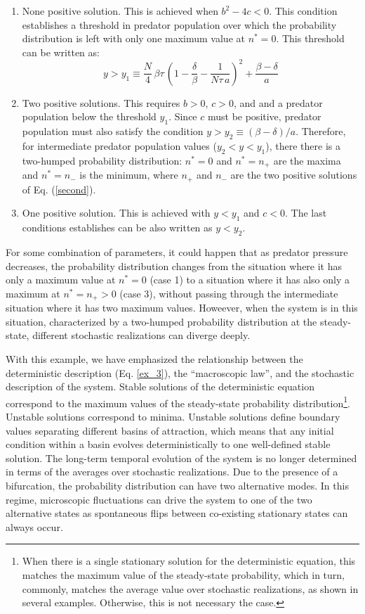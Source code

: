\documentclass{article}
\begin{document}
\begin{enumerate}
\item None positive solution. This is achieved when $b^2 - 4c<0$. This condition establishes a threshold in predator population over which the probability distribution is left with only one maximum value at $n^{*}=0$. This threshold can be written as: 
\begin{equation}
y > y_{1} \equiv \frac{N}{4}\,\beta\tau\,\left(1-\frac{\delta}{\beta}-\frac{1}{N\tau\,a}\right)^2 + \frac{\beta-\delta}{a}
\end{equation}   
\item Two positive solutions. This requires $b>0$, $c>0$, and and a predator population below the threshold $y_{1}$. Since $c$ must be positive, predator population must also satisfy the condition $y > y_{2} \equiv (\beta-\delta)/a$. Therefore, for intermediate predator population values ($y_{2}<y<y_{1}$), there there is a two-humped probability distribution: $n^{*}=0$ and $n^{*}=n_{+}$ are the maxima and $n^{*}=n_{-}$ is the minimum, where $n_{+}$ and $n_{-}$ are the two positive solutions of Eq. (\ref{second}).  
\item One positive solution. This is achieved with $y<y_{1}$ and $c<0$. The last conditions establishes can be also written as $y<y_{2}$. 
\end{enumerate}
For some combination of parameters, it could happen that as predator pressure decreases, the probability distribution changes from the situation where it has only a maximum value at $n^{*}=0$ (case 1) to a situation where it has also only a maximum at $n^{*}=n_{+}>0$ (case 3), without passing through the intermediate situation where it has two maximum values. Howeever, when the system is in this situation, characterized by a two-humped probability distribution at the steady-state, different stochastic realizations can diverge deeply.
\smallskip 
 
With this example, we have emphasized the relationship between the deterministic description (Eq. \ref{ex_3}), the ``macroscopic law'', and the stochastic description of the system. Stable solutions of the deterministic equation correspond to the maximum values of the steady-state probability distribution\footnote{When there is a single stationary solution for the deterministic equation, this matches the maximum value of the steady-state probability, which in turn, commonly, matches the average value over stochastic realizations, as shown in several examples. Otherwise, this is not necessary the case.}. Unstable solutions correspond to minima. Unstable solutions define boundary values separating different basins of attraction, which means that any initial condition within a basin evolves deterministically to one well-defined stable solution. The long-term temporal evolution of the system is no longer determined in terms of the averages over stochastic realizations. Due to the presence of a bifurcation, the probability distribution can have two alternative modes. In this regime, microscopic fluctuations can drive the system to one of the two alternative states as spontaneous flips between co-existing stationary states can always occur. 
\end{document}
